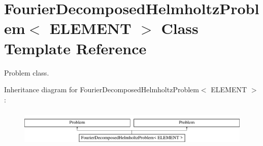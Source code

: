 \hypertarget{classFourierDecomposedHelmholtzProblem}{}\section{Fourier\+Decomposed\+Helmholtz\+Problem$<$ E\+L\+E\+M\+E\+NT $>$ Class Template Reference}
\label{classFourierDecomposedHelmholtzProblem}


Problem class.  


Inheritance diagram for Fourier\+Decomposed\+Helmholtz\+Problem$<$ E\+L\+E\+M\+E\+NT $>$\+:\begin{figure}[H]
\begin{center}
\leavevmode
\includegraphics[height=1.766562cm]{classFourierDecomposedHelmholtzProblem}
\end{center}
\end{figure}
